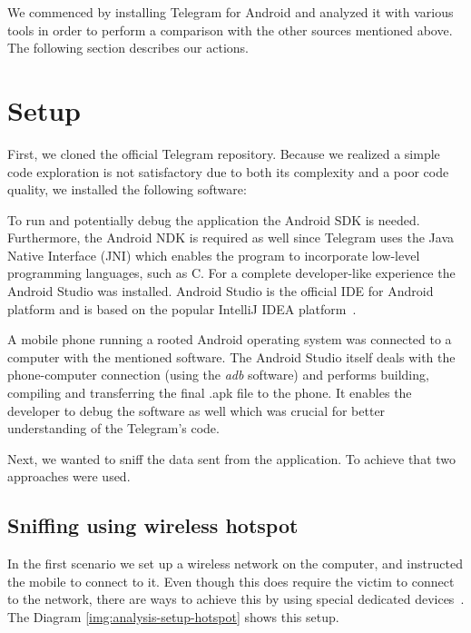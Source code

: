 \documentclass[thesis=M,english]{FITthesis}[2012/10/20]
\begin{document}
We commenced by installing Telegram for Android and analyzed it with various tools in order to perform a comparison with the other sources mentioned above. The following section describes our actions.

\section{Setup}\label{analysis-setup}

First, we cloned the official Telegram repository. Because we realized a simple code exploration is not satisfactory due to both its complexity and a poor code quality, we installed the following software:

To run and potentially debug the application the Android SDK is needed. Furthermore, the Android NDK is required as well since Telegram uses the Java Native Interface (JNI) which enables the program to incorporate low-level programming languages, such as C. For a complete developer-like experience the Android Studio was installed. Android Studio is the official IDE for Android platform and is based on the popular IntelliJ IDEA platform~\cite{android-studio}.

A mobile phone running a rooted Android operating system was connected to a computer with the mentioned software. The Android Studio itself deals with the phone-computer connection (using the \emph{adb} software) and performs building, compiling and transferring the final .apk file to the phone. It enables the developer to debug the software as well which was crucial for better understanding of the Telegram's code.

Next, we wanted to sniff the data sent from the application. To achieve that two approaches were used.

\subsection{Sniffing using wireless hotspot}

In the first scenario we set up a wireless network on the computer, and instructed the mobile to connect to it. Even though this does require the victim to connect to the network, there are ways to achieve this by using special dedicated devices~\cite{pineapple}. The Diagram \ref{img:analysis-setup-hotspot} shows this setup.
\end{document}
